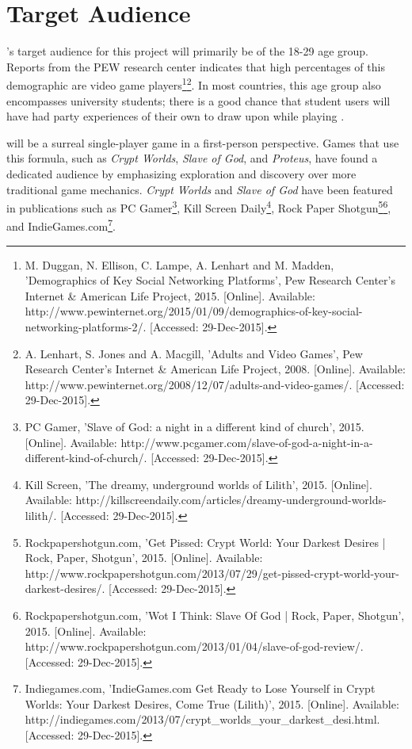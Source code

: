 \section{Target Audience}
\ourteam{}'s target audience for this project will primarily be of the 18-29 age group. Reports from the PEW research center indicates that high percentages of this demographic are video game players\footnote{M. Duggan, N. Ellison, C. Lampe, A. Lenhart and M. Madden, 'Demographics of Key Social Networking Platforms', Pew Research Center's Internet \& American Life Project, 2015. [Online]. Available: http://www.pewinternet.org/2015/01/09/demographics-of-key-social-networking-platforms-2/. [Accessed: 29-Dec-2015].}\footnote{A. Lenhart, S. Jones and A. Macgill, 'Adults and Video Games', Pew Research Center's Internet \& American Life Project, 2008. [Online]. Available: http://www.pewinternet.org/2008/12/07/adults-and-video-games/. [Accessed: 29-Dec-2015].}. In most countries, this age group also encompasses university students; there is a good chance that student users will have had party experiences of their own to draw upon while playing \ourgame{}.

\ourgame{} will be a surreal single-player game in a first-person perspective. Games that use this formula, such as \textit{Crypt Worlds}, \textit{Slave of God}, and \textit{Proteus}, have found a dedicated audience by emphasizing exploration and discovery over more traditional game mechanics. \textit{Crypt Worlds} and \textit{Slave of God} have been featured in publications such as PC Gamer\footnote{PC Gamer, 'Slave of God: a night in a different kind of church', 2015. [Online]. Available: http://www.pcgamer.com/slave-of-god-a-night-in-a-different-kind-of-church/. [Accessed: 29-Dec-2015].}, Kill Screen Daily\footnote{Kill Screen, 'The dreamy, underground worlds of Lilith', 2015. [Online]. Available: http://killscreendaily.com/articles/dreamy-underground-worlds-lilith/. [Accessed: 29-Dec-2015].}, Rock Paper Shotgun\footnote{Rockpapershotgun.com, 'Get Pissed: Crypt World: Your Darkest Desires | Rock, Paper, Shotgun', 2015. [Online]. Available: http://www.rockpapershotgun.com/2013/07/29/get-pissed-crypt-world-your-darkest-desires/. [Accessed: 29-Dec-2015].}\footnote{Rockpapershotgun.com, 'Wot I Think: Slave Of God | Rock, Paper, Shotgun', 2015. [Online]. Available: http://www.rockpapershotgun.com/2013/01/04/slave-of-god-review/. [Accessed: 29-Dec-2015].}, and IndieGames.com\footnote{Indiegames.com, 'IndieGames.com Get Ready to Lose Yourself in Crypt Worlds: Your Darkest Desires, Come True (Lilith)', 2015. [Online]. Available: http://indiegames.com/2013/07/crypt\_worlds\_your\_darkest\_desi.html. [Accessed: 29-Dec-2015].}.

